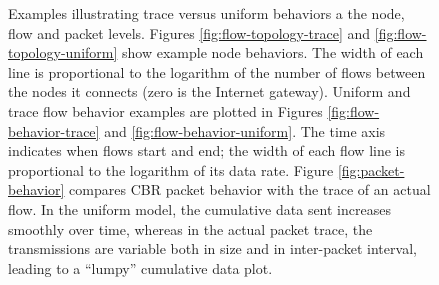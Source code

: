 \documentclass[conference]{IEEEtran}
\newcommand{\caps}[1]{{\small{#1}}}
\begin{document}
\begin{figure}[tb]
\begin{center}
\caption{Examples illustrating trace versus uniform behaviors a the node, flow and packet levels. Figures \ref{fig:flow-topology-trace} and \ref{fig:flow-topology-uniform} show example node behaviors. The width of each line is proportional to the logarithm of the number of flows between the nodes it connects (zero is the Internet gateway). Uniform and trace flow behavior examples are plotted in Figures \ref{fig:flow-behavior-trace} and \ref{fig:flow-behavior-uniform}. The time axis indicates when flows start and end; the width of each flow line is proportional to the logarithm of its data rate. Figure \ref{fig:packet-behavior} compares \caps{CBR} packet behavior with the trace of an actual flow. In the uniform model, the cumulative data sent increases smoothly over time, whereas in the actual packet trace, the transmissions are variable both in size and in inter-packet interval, leading to a ``lumpy'' cumulative data plot.}
\label{fig:traffic-models}
\end{center}
\vspace{-2em}
\end{figure}


\end{document}

